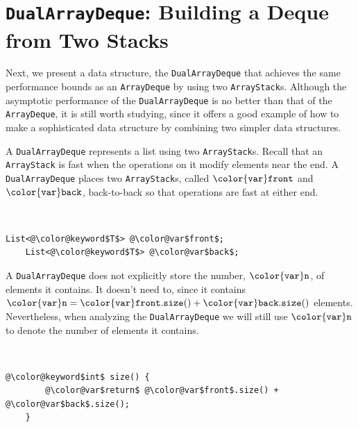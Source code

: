 \documentclass[10pt]{book}
\newcommand{\seclabel}[1]{\label{sec:#1}}
\theoremstyle{plain}
\theoremstyle{definition}
\begin{document}
\section{\texttt{DualArrayDeque}: Building a Deque from Two Stacks}
\seclabel{dualarraydeque}

%
Next, we present a data structure, the \texttt{DualArrayDeque} that
achieves the same performance bounds as an \texttt{ArrayDeque} by using
two \texttt{ArrayStack}s.  Although the asymptotic performance of the
\texttt{DualArrayDeque} is no better than that of the \texttt{ArrayDeque}, it is
still worth studying, since it offers a good example of how to make a
sophisticated data structure by combining two simpler data structures.

A \texttt{DualArrayDeque} represents a list using two \texttt{ArrayStack}s.  Recall that
an \texttt{ArrayStack} is fast when the operations on it modify elements near
the end.  A \texttt{DualArrayDeque} places two \texttt{ArrayStack}s, called \ensuremath{\mathtt{{\color{var}front}}}
and \ensuremath{\mathtt{{\color{var}back}}}, back-to-back so that operations are fast at either end.



 \ \vspace{.5ex}\begin{Verbatim}[gobble=1,tabsize=2,frame=single,framerule=1.2pt,commandchars=\\@\$,label=\texttt{DualArrayDeque},labelposition=topline]
	List<@\color@keyword$T$> @\color@var$front$;
	List<@\color@keyword$T$> @\color@var$back$;
\end{Verbatim}


A \texttt{DualArrayDeque} does not explicitly store the number, \ensuremath{\mathtt{{\color{var}n}}},
of elements it contains.  It doesn't need to, since it contains
$\ensuremath{\mathtt{{\color{var}n}}}=\ensuremath{\mathtt{{\color{var}front}.size()}} + \ensuremath{\mathtt{{\color{var}back}.size()}}$ elements.  Nevertheless, when
analyzing the \texttt{DualArrayDeque} we will still use \ensuremath{\mathtt{{\color{var}n}}} to denote the number
of elements it contains.



 \ \vspace{.5ex}\begin{Verbatim}[gobble=1,tabsize=2,frame=single,framerule=1.2pt,commandchars=\\@\$,label=\texttt{DualArrayDeque},labelposition=topline]
	@\color@keyword$int$ size() {
		@\color@var$return$ @\color@var$front$.size() + @\color@var$back$.size();		
	}
\end{Verbatim}
\end{document}
